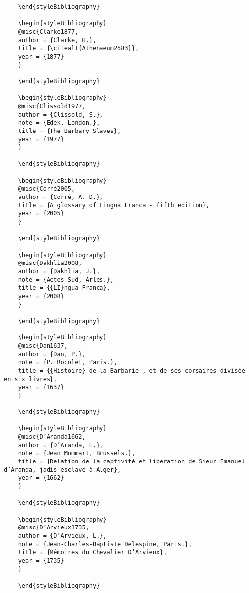 \documentclass[output=paper]{langsci/langscibook}
\begin{document}
\begin{stylelsUnNumberedSection}
\begin{verbatim}
	\end{styleBibliography}
	
	\begin{styleBibliography}
	@misc{Clarke1877,
	author = {Clarke, H.},
	title = {\citealt{Athenaeum2583}},
	year = {1877}
	}
	
	\end{styleBibliography}
	
	\begin{styleBibliography}
	@misc{Clissold1977,
	author = {Clissold, S.},
	note = {Edek, London.},
	title = {The Barbary Slaves},
	year = {1977}
	}
	
	\end{styleBibliography}
	
	\begin{styleBibliography}
	@misc{Corré2005,
	author = {Corré, A. D.},
	title = {A glossary of Lingua Franca - fifth edition},
	year = {2005}
	}
	
	\end{styleBibliography}
	
	\begin{styleBibliography}
	@misc{Dakhlia2008,
	author = {Dakhlia, J.},
	note = {Actes Sud, Arles.},
	title = {{LI}ngua Franca},
	year = {2008}
	}
	
	\end{styleBibliography}
	
	\begin{styleBibliography}
	@misc{Dan1637,
	author = {Dan, P.},
	note = {P. Rocolet, Paris.},
	title = {{Histoire} de la Barbarie , et de ses corsaires divisée en six livres},
	year = {1637}
	}
	
	\end{styleBibliography}
	
	\begin{styleBibliography}
	@misc{D’Aranda1662,
	author = {D’Aranda, E.},
	note = {Jean Mommart, Brussels.},
	title = {Relation de la captivité et liberation de Sieur Emanuel d’Aranda, jadis esclave à Alger},
	year = {1662}
	}
	
	\end{styleBibliography}
	
	\begin{styleBibliography}
	@misc{D’Arvieux1735,
	author = {D’Arvieux, L.},
	note = {Jean-Charles-Baptiste Delespine, Paris.},
	title = {Mémoires du Chevalier D’Arvieux},
	year = {1735}
	}
	
	\end{styleBibliography}
	

\end{verbatim}
\end{stylelsUnNumberedSection}
\end{document}
